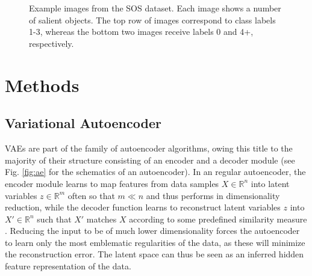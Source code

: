 \documentclass[twocolumn]{article}
\begin{document}
\begin{figure}
\centering
    \quad
    \quad
    \quad
    \\\vspace*{0.9em}\\
    \subfloat{\texttt{[image: s0]}}%
    \quad
    \subfloat{\texttt{[image: s4]}}%
    \caption{Example images from the SOS dataset. Each image shows a number of salient objects. The top row of images correspond to class labels 1-3, whereas the bottom two images receive labels 0 and 4+, respectively.}
\label{fig:sub}
\end{figure}

\hypertarget{methods}{%
\section{Methods}\label{methods}}


\hypertarget{vae}{%
\subsection{Variational Autoencoder}\label{vae}}

VAEs \citep{kingma2013auto} are part of the family of autoencoder algorithms, owing this title
to the majority of their structure consisting of an encoder and a
decoder module \citep{doersch2016tutorial} (see Fig. \ref{fig:ae} for the
schematics of an autoencoder). In an regular autoencoder, the encoder
module learns to map features from data samples \(X \in \mathbb{R}^{n}\)
into latent variables \(z \in \mathbb{R}^{m}\) often so that \(m \ll n\)
and thus performs in dimensionality reduction, while the decoder
function learns to reconstruct latent variables \(z\) into
\(X' \in \mathbb{R}^{n}\) such that \(X'\) matches \(X\) according to
some predefined similarity measure \citep{liou2014autoencoder}. Reducing
the input to be of much lower dimensionality forces the autoencoder to
learn only the most emblematic regularities of the data, as these will
minimize the reconstruction error. The latent space can thus be seen as
an inferred hidden feature representation of the data.
\end{document}

